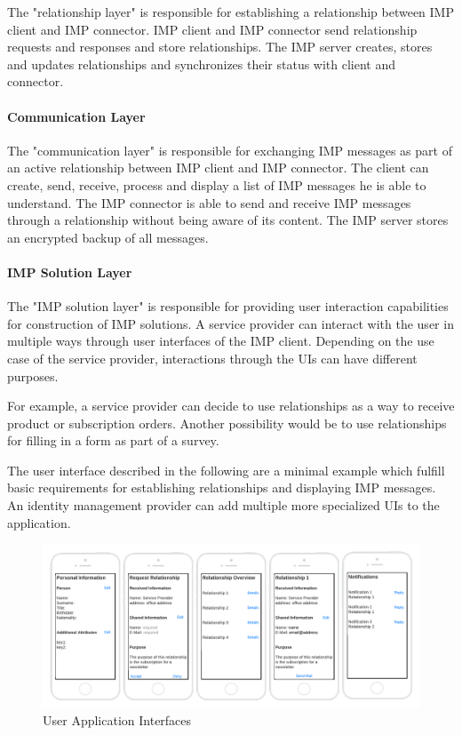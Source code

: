 The "relationship layer" is responsible for establishing a relationship between IMP client and IMP connector. IMP client and IMP connector send relationship requests and responses and store relationships. The IMP server creates, stores and updates relationships and synchronizes their status with client and connector.

\paragraph{Communication Layer}

The "communication layer" is responsible for exchanging IMP messages as part of an active relationship between IMP client and IMP connector. The client can create, send, receive, process and display a list of IMP messages he is able to understand. The IMP connector is able to send and receive IMP messages through a relationship without being aware of its content. The IMP server stores an encrypted backup of all messages.

\paragraph{IMP Solution Layer}

The "IMP solution layer" is responsible for providing user interaction capabilities for construction of IMP solutions. A service provider can interact with the user in multiple ways through user interfaces of the IMP client. Depending on the use case of the service provider, interactions through the UIs can have different purposes.

For example, a service provider can decide to use relationships as a way to receive product or subscription orders. Another possibility would be to use relationships for filling in a form as part of a survey.

The user interface described in the following are a minimal example which fulfill basic requirements for establishing relationships and displaying IMP messages. An identity management provider can add multiple more specialized UIs to the application.

\begin{figure}[h]
\caption{User Application Interfaces}
    \centering
    \includegraphics[scale=0.2]{Diagrams/UI.png}
\end{figure}

